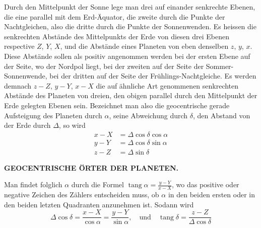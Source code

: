 Durch den Mittelpunkt der Sonne lege man drei auf einander senkrechte
Ebenen, die eine parallel mit dem Erd-Äquator, die zweite durch die Punkte
der Nachtgleichen, also die dritte durch die Punkte der Sonnenwenden. Es
heissen die senkrechten Abstände des Mittelpunkts der Erde von diesen drei
Ebenen respective $Z$, $Y$, $X$, und die Abstände eines Planeten von eben denselben
$z$, $y$, $x$. Diese Abstände sollen als positiv angenommen werden bei der ersten
Ebene auf der Seite, wo der Nordpol liegt, bei der zweiten auf der Seite
der Sommer-Sonnenwende, bei der dritten auf der Seite der Frühlings-Nachtgleiche.
Es werden demnach $z-Z$, $y-Y$, $x-X$ die auf ähnliche Art genommenen
senkrechten Abstände des Planeten von dreien, den obigen parallel durch
den Mittelpunkt der Erde gelegten Ebenen sein. Bezeichnet man also die geocentrische
gerade Aufsteigung des Planeten durch $\alpha$, seine Abweichung durch
$\delta$, den Abstand von der Erde durch $\Delta$, so wird
\[
\begin{aligned}
x-X&=\Delta\cos\delta\cos\alpha\\
y-Y&=\Delta\cos\delta\sin\alpha\\
z-Z&=\Delta\sin\delta
\end{aligned}
\]
\clearpage
\endgroup
\thispagestyle{empty}
\noindent{}%
%
\parbox[t]{\dimexpr\linewidth-24mm\relax}{\centering\footnotesize\bfseries GEOCENTRISCHE ÖRTER DER PLANETEN.\par}%
\makebox[12mm][r]{}\par\nobreak\medskip
Man findet folglich $\alpha$ durch die Formel $\operatorname{tang}\alpha=\frac{y-Y}{x-X}$, wo das positive oder
negative Zeichen des Zählers entscheiden muss, ob $\alpha$ in den beiden ersten oder
in den beiden letzten Quadranten anzunehmen ist. Sodann wird
\[
\Delta\cos\delta=\frac{x-X}{\cos\alpha}=\frac{y-Y}{\sin\alpha},\quad
\text{und}\quad\operatorname{tang}\delta=\frac{z-Z}{\Delta\cos\delta}
\]

